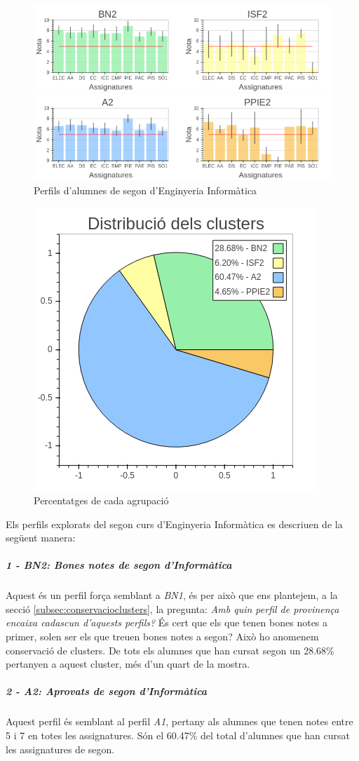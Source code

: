 \documentclass[12pt,a4paper,catalan]{article}
\begin{document}
\begin{figure}[h]
\centering
\includegraphics[width=.8\linewidth]{img/perfils_segon_info.png}
\caption{Perfils d'alumnes de segon d'Enginyeria Informàtica}
\label{fig:perfilssegoninfo}
\end{figure}

\begin{figure}[h]
\centering
\includegraphics[width=.4\linewidth]{img/perfils_segon_info_pastilla.png}
\caption{Percentatges de cada agrupació}
\end{figure}


Els perfils explorats del segon curs d'Enginyeria Informàtica es descriuen de la següent manera:

\subparagraph{1 - BN2: Bones notes de segon d'Informàtica}
Aquest és un perfil força semblant a \textit{BN1}, és per això que ens plantejem, a la secció \ref{subsec:conservacioclusters}, la pregunta: \textit{Amb quin perfil de provinença encaixa cadascun d'aquests perfils?} És cert que els que tenen bones notes a primer, solen ser els que treuen bones notes a segon? Això ho anomenem conservació de clusters. De tots els alumnes que han cursat segon un 28.68\% pertanyen a aquest cluster, més d'un quart de la mostra.

\subparagraph{2 - A2: Aprovats de segon d'Informàtica}
Aquest perfil és semblant al perfil \textit{A1}, pertany als alumnes que tenen notes entre 5 i 7 en totes les assignatures. Són el 60.47\% del total d'alumnes que han cursat les assignatures de segon.
\end{document}

